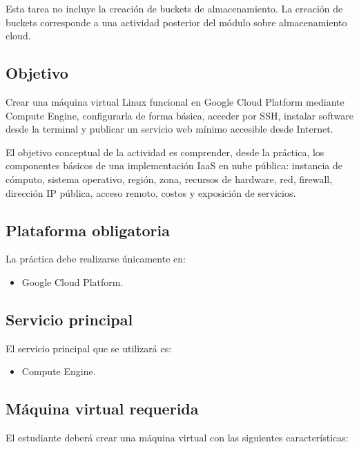 \documentclass[
  coursetitle={Cómputo Nube y Tecnologías Emergentes},
  coursehours={96},
  coursedate={Verano 2026},
  doctype={Tarea 2},
  otherlangs={english,french},
  authorname={Lázaro},
  authorsurname={Bustio-Martínez},
  authortitle={PhD},
  role={Profesor Investigador},
  email={lbustio@inaoe.mx},
  phone={5559504000},
  ext={7459},
  institution={Instituto Nacional de Astrofísica, Óptica y Electrónica (INAOE)},
  department={Maestría en Ciencias en Tecnologías de Seguridad},
  address={Luis Enrique Erro 1, Sta. Ma. Tonantzintla, San Andrés Cholula, CP 72840, Puebla, México},
  margin={0.5in}
]{lbustio_lecture_notes}
\begin{document}
Esta tarea no incluye la creación de buckets de almacenamiento. La creación de buckets corresponde a una actividad posterior del módulo sobre almacenamiento cloud.

\subsection{Objetivo}
\label{sec:tarea2-objetivo}

Crear una máquina virtual Linux funcional en Google Cloud Platform mediante Compute Engine, configurarla de forma básica, acceder por SSH, instalar software desde la terminal y publicar un servicio web mínimo accesible desde Internet.

El objetivo conceptual de la actividad es comprender, desde la práctica, los componentes básicos de una implementación IaaS en nube pública: instancia de cómputo, sistema operativo, región, zona, recursos de hardware, red, firewall, dirección IP pública, acceso remoto, costos y exposición de servicios.

\subsection{Plataforma obligatoria}
\label{sec:tarea2-plataforma}

La práctica debe realizarse únicamente en:

\begin{itemize}
  \item Google Cloud Platform.
\end{itemize}

\subsection{Servicio principal}
\label{sec:tarea2-servicio}

El servicio principal que se utilizará es:

\begin{itemize}
  \item Compute Engine.
\end{itemize}

\subsection{Máquina virtual requerida}
\label{sec:tarea2-vm-requerida}

El estudiante deberá crear una máquina virtual con las siguientes características:
\end{document}
